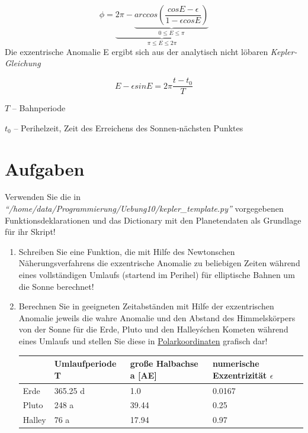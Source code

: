 \documentclass{scrartcl}	    %
\begin{document}
\[
\phi = \underbrace{2\pi - \underbrace{arccos(\frac{cos E-\epsilon}{1-\epsilon cos E})}_{0 \le E \le \pi}}_{\pi \le E \le 2\pi}
\]
Die exzentrische Anomalie E ergibt sich aus der analytisch nicht löbaren \emph{Kepler-Gleichung}

\[
E - \epsilon sin E = 2 \pi \frac{t - t_0}{T}
\]
\begin{description}
\item $T$ -- Bahnperiode
\item $t_0$ -- Perihelzeit, Zeit des Erreichens des Sonnen-nächsten Punktes
\end{description}

\section*{Aufgaben}
Verwenden Sie die in \emph{"`/home/data/Programmierung/Uebung10/kepler\_template.py"'} 
vorgegebenen Funktionsdeklarationen und das Dictionary mit den Planetendaten als Grundlage für ihr Skript!

\begin{enumerate}
\item Schreiben Sie eine Funktion, die mit Hilfe des Newtonschen Näherungsverfahrens die exzentrische Anomalie zu beliebigen Zeiten während eines vollständigen Umlaufs (startend im Perihel) für elliptische Bahnen um die Sonne berechnet!
\item Berechnen Sie in geeigneten Zeitabständen mit Hilfe der exzentrischen Anomalie jeweils die wahre Anomalie und den Abstand des Himmelskörpers von der Sonne für die Erde, Pluto und den Halley\'schen Kometen während eines Umlaufs und stellen Sie diese in \href{http://matplotlib.org/api/pyplot_api.html#matplotlib.pyplot.polar}{Polarkoordinaten} grafisch dar! %

\begin{tabular}{|m{1cm}|m{3.5cm}|m{3.5cm}|m{3.5cm}|}\hline
&Umlaufperiode \newline T& große Halbachse \newline a [AE]&numerische Exzentrizität $\epsilon$\\ \hline
Erde&365.25 d&1.0&0.0167\\
Pluto&248 a&39.44&0.25\\
Halley&76 a&17.94&0.97\\ \hline
\end{tabular}
\end{enumerate}
\end{document}
